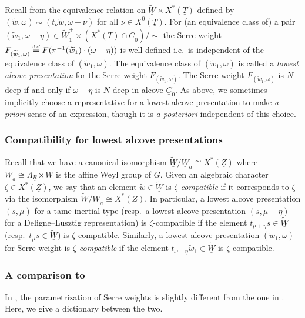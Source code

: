 \documentclass[oneside,a4paper,english, 11pt]{amsart}
\theoremstyle{plain}
\theoremstyle{plain}
\theoremstyle{plain}
\theoremstyle{plain}
\theoremstyle{plain}
\theoremstyle{plain}
\theoremstyle{definition}
\theoremstyle{definition}
\theoremstyle{definition}
\theoremstyle{remark}
\numberwithin{equation}{section}
\newcommand{\un}[1]{\underline{#1}}
\newcommand{\tld}[1]{\widetilde{#1}}
\newcommand{\defeq}{\stackrel{\textrm{\tiny{def}}}{=}}
\begin{document}
Recall from \cite[\S 2.2]{MLM} the equivalence relation on $\tld{\un{W}} \times X^*(\un{T})$ defined by $(\tld{w},\omega) \sim (t_\nu \tld{w},\omega-\nu)$ for all $\nu \in X^0(\un{T})$. 
For (an equivalence class of) a pair $(\tld{w}_1,\omega-\eta)\in \tld{\un{W}}^+_1\times (X^*(\un{T})\cap \un{C}_0)/\sim$ the Serre weight $F_{(\tld{w}_1,\omega)}\defeq F(\pi^{-1}(\tld{w}_1)\cdot (\omega-\eta))$ is well defined i.e.~is independent of the equivalence class of $(\tld{w}_1,\omega)$. 
%
%
%
The equivalence class of $(\tld{w}_1,\omega)$ is called a \emph{lowest alcove presentation} for the Serre weight $F_{(\tld{w}_1,\omega)}$. 
The Serre weight $F_{(\tld{w}_1,\omega)}$ is $N$-deep if and only if $\omega-\eta$ is $N$-deep in alcove $\un{C}_0$.
As above, we sometimes implicitly choose a representative for a lowest alcove presentation to make \emph{a priori} sense of an expression, though it is \emph{a posteriori} independent of this choice. 

\subsubsection{Compatibility for lowest alcove presentations} 
Recall that we have a canonical isomorphism $\tld{\un{W}}/\un{W}_a \cong X^*(\un{Z})$ where $\un{W}_a\cong \Lambda_{\un{R}} \rtimes \un{W}$ is the affine Weyl group of $\un{G}$.
Given an algebraic character $\zeta\in X^*(\un{Z})$, we say that an element $\tld{w}\in \tld{\un{W}}$ is \emph{$\zeta$-compatible} if it corresponds to $\zeta$ via the isomorphism $\tld{\un{W}}/\un{W}_a \cong X^*(\un{Z})$.
In particular, a lowest alcove presentation $(s,\mu)$ for a tame inertial type (resp.~a lowest alcove presentation $(s,\mu-\eta)$ for a Deligne--Lusztig representation) is $\zeta$-compatible if the element $t_{\mu+\eta} s \in \tld{\un{W}}$ (resp.~$t_{\mu} s \in \tld{\un{W}}$) is $\zeta$-compatible.
Similarly, a lowest alcove presentation $(\tld{w}_1,\omega)$ for Serre weight is \emph{$\zeta$-compatible} if the element $t_{\omega-\eta}\tld{w}_1\in \tld{\un{W}}$ is $\zeta$-compatible. %


%


%
\subsubsection{A comparison to \cite{LLLM2}}
\label{subsec:param:SW}
%
%
%
%
%
%
%
%
%
%
%
In \cite{LLLM2}, the parametrization of Serre weights is slightly different from the one in \cite{MLM}.
Here, we give a dictionary between the two.
\end{document}
